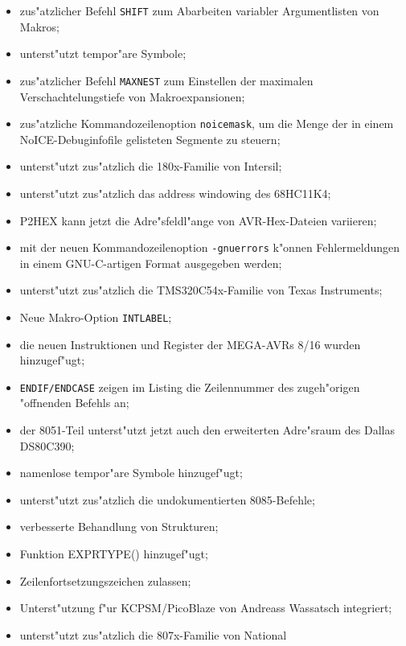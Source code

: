 \documentclass[12pt,a4paper,twoside]{report}
\begin{document}
{\begin{itemize}
{\begin{itemize}
{            {\tt ARGCOUNT};}
      \item{zus"atzlicher Befehl {\tt SHIFT} zum Abarbeiten variabler
            Argumentlisten von Makros;}
      \item{unterst"utzt tempor"are Symbole;}
      \item{zus"atzlicher Befehl {\tt MAXNEST} zum Einstellen der
            maximalen Verschachtelungstiefe von Makroexpansionen;}
      \item{zus"atzliche Kommandozeilenoption {\tt noicemask}, um
            die Menge der in einem NoICE-Debuginfofile gelisteten Segmente
            zu steuern;} 
      \item{unterst"utzt zus"atzlich die 180x-Familie von Intersil;}
      \item{unterst"utzt zus"atzlich das address windowing des 68HC11K4;}
      \item{P2HEX kann jetzt die Adre"sfeldl"ange von AVR-Hex-Dateien
            variieren;}
      \item{mit der neuen Kommandozeilenoption {\tt -gnuerrors} k"onnen
            Fehlermeldungen in einem GNU-C-artigen Format ausgegeben
            werden;}
      \item{unterst"utzt zus"atzlich die TMS320C54x-Familie von Texas
            Instruments;}
      \item{Neue Makro-Option {\tt INTLABEL};}
      \item{die neuen Instruktionen und Register der MEGA-AVRs 8/16
            wurden hinzugef"ugt;}
      \item{{\tt ENDIF/ENDCASE} zeigen im Listing die Zeilennummer des
            zugeh"origen "offnenden Befehls an;}
      \item{der 8051-Teil unterst"utzt jetzt auch den erweiterten
            Adre"sraum des Dallas DS80C390;}
      \item{namenlose tempor"are Symbole hinzugef"ugt;}
      \item{unterst"utzt zus"atzlich die undokumentierten 8085-Befehle;}
      \item{verbesserte Behandlung von Strukturen;}
      \item{Funktion EXPRTYPE() hinzugef"ugt;}
      \item{Zeilenfortsetzungszeichen zulassen;}
      \item{Unterst"utzung f"ur KCPSM/PicoBlaze von Andreass Wassatsch
            integriert;}
      \item{unterst"utzt zus"atzlich die 807x-Familie von National
}
\end{itemize}}
\end{itemize}}
\end{document}
